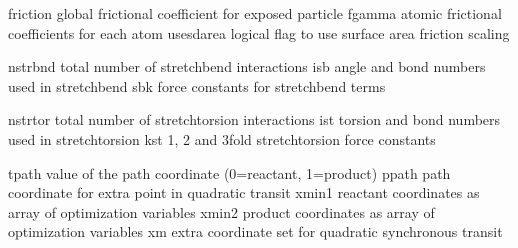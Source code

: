 \documentclass[letterpaper,11pt,english]{sphinxmanual}
\begin{document}
\sphinxAtStartPar
{}

\begin{sphinxVerbatim}[commandchars=\\\{\}]
friction        global frictional coefficient for exposed particle
fgamma          atomic frictional coefficients for each atom
use\PYGZus{}sdarea      logical flag to use surface area friction scaling
\end{sphinxVerbatim}

\sphinxAtStartPar
{}

\begin{sphinxVerbatim}[commandchars=\\\{\}]
nstrbnd         total number of stretch\PYGZhy{}bend interactions
isb             angle and bond numbers used in stretch\PYGZhy{}bend
sbk             force constants for stretch\PYGZhy{}bend terms
\end{sphinxVerbatim}

\sphinxAtStartPar
{}

\begin{sphinxVerbatim}[commandchars=\\\{\}]
nstrtor         total number of stretch\PYGZhy{}torsion interactions
ist             torsion and bond numbers used in stretch\PYGZhy{}torsion
kst             1\PYGZhy{}, 2\PYGZhy{} and 3\PYGZhy{}fold stretch\PYGZhy{}torsion force constants
\end{sphinxVerbatim}

\sphinxAtStartPar
{}

\begin{sphinxVerbatim}[commandchars=\\\{\}]
tpath           value of the path coordinate (0=reactant, 1=product)
ppath           path coordinate for extra point in quadratic transit
xmin1           reactant coordinates as array of optimization variables
xmin2           product coordinates as array of optimization variables
xm              extra coordinate set for quadratic synchronous transit
\end{sphinxVerbatim}

\sphinxAtStartPar
{}
\end{document}

